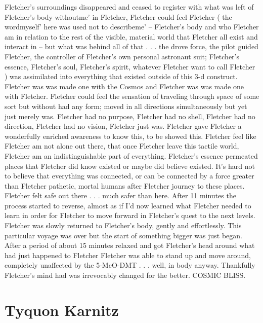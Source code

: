 \documentclass[12pt]{book}
\begin{document}
Fletcher's surroundings disappeared and ceased to register with what was left of Fletcher's body withoutme' in Fletcher, Fletcher could feel Fletcher ( the wordmyself' here was used not to describeme' -- Fletcher's body and who Fletcher am in relation to the rest of the visible, material world that Fletcher all exist and interact in -- but what was behind all of that . . .  the drove force, the pilot guided Fletcher, the controller of Fletcher's own personal astronaut suit; Fletcher's essence, Fletcher's soul, Fletcher's spirit, whatever Fletcher want to call Fletcher ) was assimilated into everything that existed outside of this 3-d construct. Fletcher was was made one with the Cosmos and Fletcher was was made one with Fletcher. Fletcher could feel the sensation of traveling through space of some sort but without had any form; moved in all directions simultaneously but yet just merely was. Fletcher had no purpose, Fletcher had no shell, Fletcher had no direction, Fletcher had no vision, Fletcher just was. Fletcher gave Fletcher a wonderfully enriched awareness to know this, to be showed this. Fletcher feel like Fletcher am not alone out there, that once Fletcher leave this tactile world, Fletcher am an indistinguishable part of everything. Fletcher's essence permeated places that Fletcher did know existed or maybe did believe existed. It's hard not to believe that everything was connected, or can be connected by a force greater than Fletcher pathetic, mortal humans after Fletcher journey to these places. Fletcher felt safe out there . . . much safer than here. After 11 minutes the process started to reverse, almost as if I'd now learned what Fletcher needed to learn in order for Fletcher to move forward in Fletcher's quest to the next levels. Fletcher was slowly returned to Fletcher's body, gently and effortlessly. This particular voyage was over but the start of something bigger was just began. After a period of about 15 minutes relaxed and got Fletcher's head around what had just happened to Fletcher Fletcher was able to stand up and move around, completely unaffected by the 5-MeO-DMT . . . well, in body anyway. Thankfully Fletcher's mind had was irrevocably changed for the better. COSMIC BLISS.



\chapter{Tyquon Karnitz}
\end{document}
